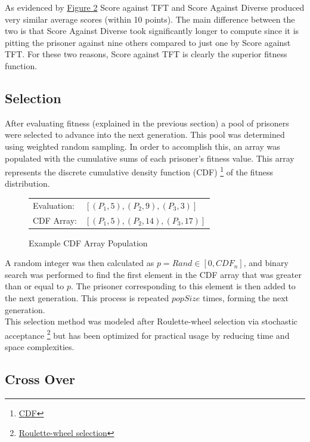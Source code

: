 \documentclass[12pt]{article}
\begin{document}
As evidenced by \hyperref[fig2]{Figure 2} Score against TFT and Score Against Diverse
produced very similar average scores (within 10 points).  The main difference
between the two is that Score Against Diverse took significantly longer to compute
since it is pitting the prisoner against nine others compared to just one by Score against TFT.
For these two reasons, Score against TFT is clearly the superior fitness function.

\subsection{Selection}

After evaluating fitness (explained in the previous section) a pool of
prisoners were selected to advance into the next generation.  This pool was
determined using weighted random sampling. In order to accomplish this, an array
was populated with the cumulative sums of each prisoner's fitness value.  This
array represents the discrete cumulative density function (CDF)
\footnote{\href{https://en.wikipedia.org/wiki/Cumulative distribution function}{CDF}}
of the fitness distribution.

\begin{figure}[h]
    \centering
    \begin{tabular}{l l}
        Evaluation: & $[(P_1, 5), (P_2, 9), (P_3, 3)]$ \\
        CDF Array: & $[(P_1, 5), (P_2, 14), (P_3, 17)]$ \\
    \end{tabular}
    \caption{Example CDF Array Population}
\end{figure}

A random integer was then calculated as $p = Rand \in [0, CDF_n]$,
and binary search was performed to find the first element in the CDF array that
was greater than or equal to $p$.  The prisoner corresponding to this element
is then added to the next generation.  This process is repeated $popSize$ times,
forming the next generation. \\

This selection method was modeled after Roulette-wheel selection via stochastic acceptance
\footnote{\href{http://arxiv.org/pdf/1109.3627.pdf}{Roulette-wheel selection}}
but has been optimized for practical usage by reducing time and space complexities.

\subsection{Cross Over}
\end{document}
